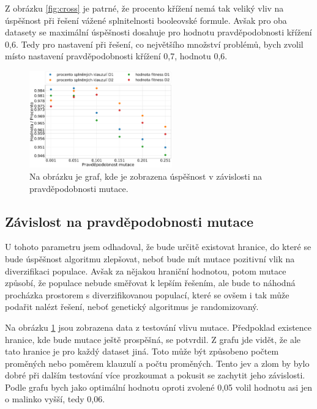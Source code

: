 \documentclass[11pt]{article}
\begin{document}
Z obrázku \ref{fig:cross} je patrné, že procento křížení nemá tak veliký vliv na úspěšnost při řešení vážené splnitelnosti booleovské formule. Avšak pro oba datasety se maximální úspěšnosti dosahuje pro hodnotu pravděpodobnosti křížení 0,6. Tedy pro nastavení při řešení, co největšího množství problémů, bych zvolil místo nastavení pravděpodobnosti křížení 0,7, hodnotu 0,6.

\begin{figure}
\begin{center}
\includegraphics[width=0.55\textwidth]{img/sat_mut.pdf} 
\caption{Na obrázku je graf, kde je zobrazena úspěšnost v závislosti na pravděpodobnosti mutace.}
\label{fig:mut}
\end{center}
\end{figure}

\subsection{Závislost na pravděpodobnosti mutace}
U tohoto parametru jsem odhadoval, že bude určitě existovat hranice, do které se bude úspěšnost algoritmu zlepšovat, neboť bude mít mutace pozitivní vlik na diverzifikaci populace. Avšak za nějakou hraniční hodnotou, potom mutace způsobí, že populace nebude směřovat k lepším řešením, ale bude to náhodná procházka prostorem s diverzifikovanou populací, které se ovšem i tak může podařit nalézt řešení, neboť genetický algoritmus je randomizovaný.

Na obrázku \ref{fig:mut} jsou zobrazena data z testování vlivu mutace. Předpoklad existence hranice, kde bude mutace ještě prospěšná, se potvrdil. Z grafu jde vidět, že ale tato hranice je pro každý dataset jiná. Toto může být způsobeno počtem proměných nebo poměrem klauzulí a počtu proměných. Tento jev a zlom by bylo dobré při dalším testování více prozkoumat a pokusit se zachytit jeho závislosti. Podle grafu bych jako optimální hodnotu oproti zvolené 0,05 volil hodnotu asi jen o malinko vyšší, tedy 0,06. 
\end{document}
